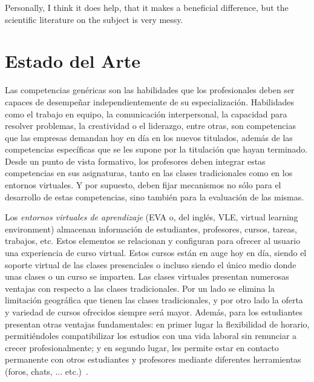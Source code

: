 

\begin{savequote}[50mm]
Personally, I think it does help, that it makes a beneficial difference, but the scientific literature on the subject is very messy.
%
\end{savequote}


\chapter{Estado del Arte}
\label{cha:State of the Art}

\ifpdf
    \graphicspath{{2_state_of_the_art/figures/PNG/}{2_state_of_the_art/figures/PDF/}{2_state_of_the_art/figures/}}
\else
    \graphicspath{{2_state_of_the_art/figures/EPS/}{2_state_of_the_art/figures/}}
\fi



Las competencias genéricas son las habilidades que los profesionales deben ser capaces de desempeñar independientemente de su especialización. Habilidades como el trabajo en equipo, la comunicación interpersonal, la capacidad para resolver problemas, la creatividad o el liderazgo, entre otras, son competencias que las empresas demandan hoy en día en los nuevos titulados, además de las competencias específicas que se les supone por la titulación que hayan terminado. Desde un punto de vista formativo, los profesores deben integrar estas competencias en sus asignaturas, tanto en las clases tradicionales como en los entornos virtuales. Y por supuesto, deben fijar mecanismos no sólo para el desarrollo de estas competencias, sino también para la evaluación de las mismas.

Los \emph{entornos virtuales de aprendizaje} (EVA o, del inglés, VLE, virtual learning environment) almacenan información de estudiantes, profesores, cursos, tareas, trabajos, etc. Estos elementos se relacionan y configuran para ofrecer al usuario una experiencia de curso virtual. Estos cursos están en auge hoy en día, siendo el soporte virtual de las clases presenciales o incluso siendo el único medio donde unas clases o un curso se imparten. Las clases virtuales presentan numerosas ventajas con respecto a las clases tradicionales. Por un lado se elimina la limitación geográfica que tienen las clases tradicionales, y por otro lado la oferta y variedad de cursos ofrecidos siempre será mayor. Además, para los estudiantes presentan otras ventajas fundamentales: en primer lugar la flexibilidad de horario, permitiéndoles compatibilizar los estudios con una vida laboral sin renunciar a crecer profesionalmente; y en segundo lugar, les permite estar en contacto permanente con otros estudiantes y profesores mediante diferentes herramientas (foros, chats, ... etc.)~\cite{alAjlan:2008}.

